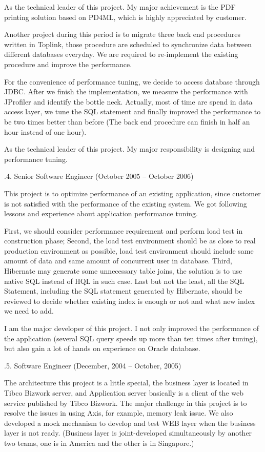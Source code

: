 As the technical leader of this project. My major achievement is
 the PDF printing solution based on PD4ML, which is highly appreciated by customer.

\smallskip

Another project during this period is to migrate three back end procedures
written in Toplink, those procedure are scheduled to synchronize data between 
different databases everyday. We are required to re-implement
the existing procedure and improve the performance. 

For the convenience of performance tuning, we decide to access database through JDBC.
After we finish the implementation, we measure the performance with JProfiler and identify the
bottle neck. Actually, most of time are spend in data access layer, we tune
the SQL statement and finally improved the performance to be two times better than before
(The back end procedure can finish in half an hour instead of one hour).

As the technical leader of this project. My major responsibility is
designing and performance tuning.

.4. Senior Software Engineer (October 2005 -- October 2006)\par
\noindent
This project is to optimize performance of an existing application, 
since customer is not satisfied with the performance of the existing system. 
We got following lessons and experience about application performance tuning. 

First, we should consider performance requirement and perform load test in construction phase; 
Second, the load test environment should be as close to real production environment as possible,
load test environment should include same amount of data and same amount of concurrent user in database. 
Third, Hibernate may generate some unnecessary table joins, the solution
is to use native SQL instead of HQL in such case. 
Last but not the least, all the SQL Statement, including the SQL statement 
generated by Hibernate, should be reviewed to decide whether existing index 
is enough or not and what new index we need to add. 

I am the major developer of this project. I not only improved the performance
of the application (several SQL query speeds up more than ten times after tuning),
but also gain a lot of hands on experience on Oracle database.

.5. Software Engineer (December, 2004 -- October, 2005)\par
\noindent
The architecture this project is a little special, the business layer is located 
in Tibco Bizwork server, and Application server  basically is a client of the 
web service published by Tibco Bizwork. The major challenge in this project 
is to resolve the issues in using Axis, for example, memory leak issue. 
We also developed a mock mechanism to develop and test WEB layer when the
 business layer is not ready. (Business layer is joint-developed simultaneously 
 by another two teams, one is in America and the other is in Singapore.)

